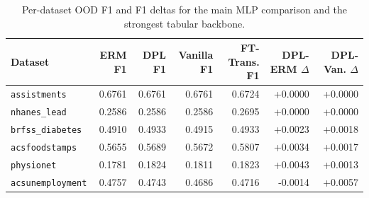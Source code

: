 \begin{table}[t]
\centering
\scriptsize
\caption{Per-dataset OOD F1 and F1 deltas for the main MLP comparison and the strongest tabular backbone.}
\label{tab:per_dataset}
\setlength{\tabcolsep}{4pt}
\begin{tabular}{@{}lrrrrrr@{}}
\toprule
Dataset & ERM F1 & DPL F1 & Vanilla F1 & FT-Trans. F1 & DPL-ERM $\Delta$ & DPL-Van. $\Delta$ \\
\midrule
\texttt{assistments} & 0.6761 & 0.6761 & 0.6761 & 0.6724 & +0.0000 & +0.0000 \\
\texttt{nhanes\_lead} & 0.2586 & 0.2586 & 0.2586 & 0.2695 & +0.0000 & +0.0000 \\
\texttt{brfss\_diabetes} & 0.4910 & 0.4933 & 0.4915 & 0.4933 & +0.0023 & +0.0018 \\
\texttt{acsfoodstamps} & 0.5655 & 0.5689 & 0.5672 & 0.5807 & +0.0034 & +0.0017 \\
\texttt{physionet} & 0.1781 & 0.1824 & 0.1811 & 0.1823 & +0.0043 & +0.0013 \\
\texttt{acsunemployment} & 0.4757 & 0.4743 & 0.4686 & 0.4716 & -0.0014 & +0.0057 \\
\bottomrule
\end{tabular}
\end{table}
